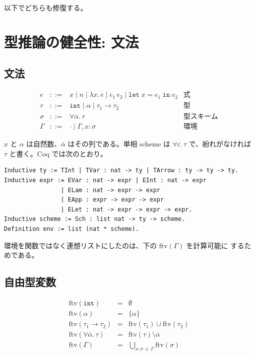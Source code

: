 \documentclass[11pt,a4paper]{ltjsarticle}
\newcommand{\tint}{\mathtt{int}}
\newcommand{\ftv}{\mathrm{ftv}}
\begin{document}
以下でどちらも修復する。

\section{型推論の健全性: 文法}
\label{sec:sound-syntax}

\subsection{文法}

\[
\begin{array}{lcll}
  e     & ::= & x \mid n \mid \lambda x.\,e \mid e_1\,e_2
                \mid \mathtt{let}\;x = e_1\;\mathtt{in}\;e_2
        & \text{式}\\[2pt]
  \tau  & ::= & \tint \mid \alpha \mid \tau_1 \to \tau_2
        & \text{型}\\[2pt]
  \sigma & ::= & \forall \bar\alpha.\,\tau
        & \text{型スキーム}\\[2pt]
  \Gamma & ::= & \cdot \mid \Gamma, x{:}\sigma
        & \text{環境}
\end{array}
\]

$x$ と $\alpha$ は自然数、$\bar\alpha$ はその列である。単相 scheme は
$\forall \varepsilon.\,\tau$ で、紛れがなければ $\tau$ と書く。Coq では次のとおり。

\begin{lstlisting}
Inductive ty := TInt | TVar : nat -> ty | TArrow : ty -> ty -> ty.
Inductive expr := EVar : nat -> expr | EInt : nat -> expr
                | ELam : nat -> expr -> expr
                | EApp : expr -> expr -> expr
                | ELet : nat -> expr -> expr -> expr.
Inductive scheme := Sch : list nat -> ty -> scheme.
Definition env := list (nat * scheme).
\end{lstlisting}

環境を関数ではなく連想リストにしたのは、下の $\ftv(\Gamma)$ を計算可能に
するためである。

\subsection{自由型変数}

\[
\begin{array}{lcl}
  \ftv(\tint) &=& \emptyset \\
  \ftv(\alpha) &=& \{\alpha\} \\
  \ftv(\tau_1 \to \tau_2) &=& \ftv(\tau_1) \cup \ftv(\tau_2) \\[2pt]
  \ftv(\forall\bar\alpha.\,\tau) &=& \ftv(\tau) \setminus \bar\alpha \\
  \ftv(\Gamma) &=& \textstyle\bigcup_{x:\sigma \,\in\, \Gamma} \ftv(\sigma)
\end{array}
\]
\end{document}
